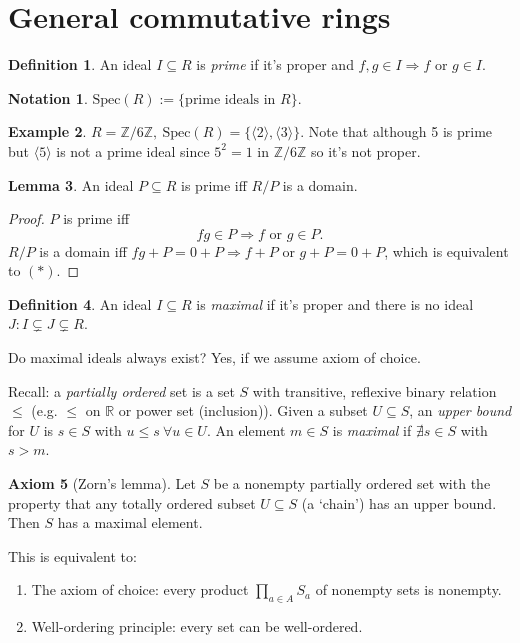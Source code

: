 \documentclass[a4paper]{article}
\newcommand{\Spec}{\text{Spec}}
\theoremstyle{definition}
\newtheorem{defn}{Definition}[subsection]
\newtheorem{lemma}[defn]{Lemma}
\newtheorem{example}[defn]{Example}
\newtheorem{axiom}[defn]{Axiom}
\newtheorem*{notation}{Notation}
\begin{document}
\section{General commutative rings}
\begin{defn}
An ideal $I\subseteq R$ is \textit{prime} if it's proper and $f,g\in I\Rightarrow f$ or $g\in I$.
\end{defn}
\begin{notation}
$\Spec(R):=\{\text{prime ideals in }R\}$.
\end{notation}
\begin{example}
$R=\mathbb Z/6\mathbb Z,\ \Spec(R)=\{\langle 2\rangle,\langle 3\rangle\}$.  Note that although 5 is prime but $\langle 5\rangle$ is not a prime ideal since $5^2=1$ in $\mathbb Z/6\mathbb Z$ so it's not proper.
\end{example}
\begin{lemma}
An ideal $P\subseteq R$ is prime iff $R/P$ is a domain.
\end{lemma}
\begin{proof}
$P$ is prime iff
\[
fg\in P\Rightarrow f \text{ or } g\in P. \tag{$\ast$}
\]
$R/P$ is a domain iff $fg+P=0+P \Rightarrow f+P$ or $g+P=0+P$, which is equivalent to $(\ast)$.
\end{proof}

\begin{defn}
An ideal $I\subseteq R$ is \textit{maximal} if it's proper and there is no ideal $J:I\subsetneq J\subsetneq R$.
\end{defn}

Do maximal ideals always exist? Yes, if we assume axiom of choice.

Recall: a \textit{partially ordered} set is a set $S$ with transitive, reflexive binary relation $\leq$ (e.g. $\leq$ on $\mathbb R$ or power set (inclusion)). Given a subset $U\subseteq S$, an \textit{upper bound} for $U$ is $s\in S$ with $u\leq s \ \forall u\in U$. An element $m\in S$ is \textit{maximal} if $\nexists s\in S$ with $s>m$.

\begin{axiom}[Zorn's lemma]
Let $S$ be a nonempty partially ordered set with the property that any totally ordered subset $U\subseteq S$ (a `chain') has an upper bound. Then $S$ has a maximal element.
\end{axiom}

This is equivalent to:
\begin{enumerate}
\item The axiom of choice: every product $\prod_{a\in A} S_a$ of nonempty sets is nonempty.
\item Well-ordering principle: every set can be well-ordered.
\end{enumerate}
\end{document}
